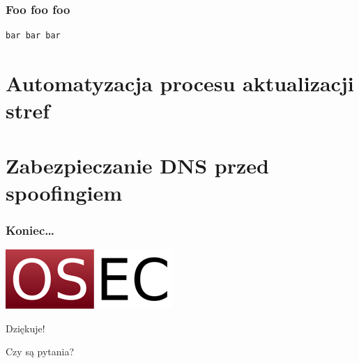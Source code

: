 \documentclass[dvipsnames,table]{beamer}
\begin{document}
\begin{frame}[fragile]
\frametitle{Foo foo foo}
\begin{verbatim}
bar bar bar
\end{verbatim}
\end{frame}

\section{Automatyzacja procesu aktualizacji stref}

\section{Zabezpieczanie DNS przed spoofingiem}

\begin{frame}
\frametitle{Koniec\ldots}
\begin{center}
\includegraphics[scale=0.5]{img-oseclogo.png}

Dziękuje!

Czy są pytania?
\end{center}

\end{frame}

 
\end{document}
